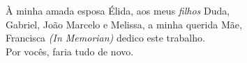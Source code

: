 \documentclass[tcc]{ic}
\begin{document}

\capa

\newpage
\thispagestyle{empty}


 \newpage
 \thispagestyle{empty}
 \mbox{}\vfill
 \begin{flushright}
 À minha amada esposa Élida, aos meus \emph{filhos} Duda, \\
 Gabriel, João Marcelo e Melissa, a minha querida Mãe,\\
 Francisca \textit{(In Memorian)} dedico este trabalho. \\
 Por vocês, faria tudo de novo.
 \end{flushright}
\end{document}
